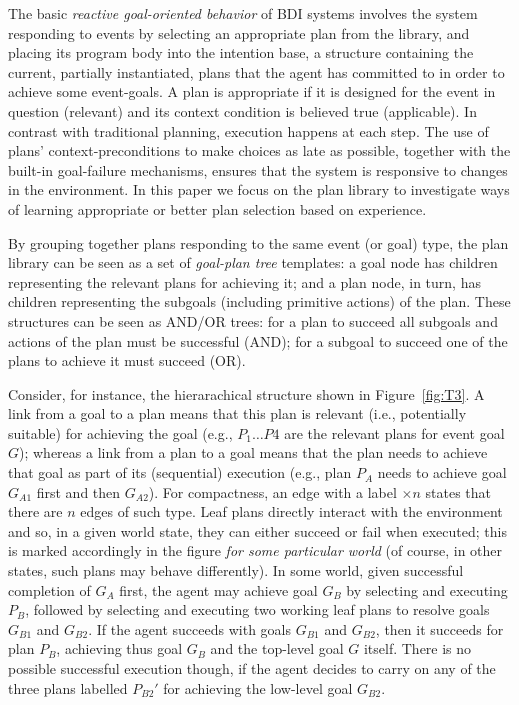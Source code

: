 The basic \emph{reactive goal-oriented behavior} of BDI systems involves the
system responding to events by selecting an appropriate plan from the library,
and placing its program body into the intention base, a structure containing the
current, partially instantiated, plans that the agent has committed to in order
to achieve some event-goals.
A plan is appropriate if it is designed for the event in question (relevant) and
its context condition is believed true (applicable).
In contrast with traditional planning, execution happens at each step. The use of
plans' context-preconditions to make choices as late as possible, together with
the built-in goal-failure mechanisms, ensures that the system is responsive to
changes in the environment.
In this paper we focus on the plan library to investigate ways of learning
appropriate or better plan selection based on experience.

By grouping together plans responding to the same
event (or goal) type, the plan library can be seen as a set of \emph{goal-plan tree}
templates: a goal node has children representing the
relevant plans for achieving it; and a plan node, in turn, has children
representing the subgoals (including primitive actions) of the plan.
These structures can be seen as AND/OR trees: for a plan to succeed all
subgoals and actions of the plan must be successful (AND); for a subgoal to
succeed one of the plans to achieve it must succeed (OR).


Consider, for instance, the hierarachical structure shown in Figure~\ref{fig:T3}.
A link from a goal to a plan means that this plan is relevant (i.e., potentially
suitable) for achieving the goal (e.g., $P_1 \ldots P4$ are the relevant plans
for event goal $G$); whereas a link from a plan to a goal means that the plan
needs to achieve that goal as part of its (sequential) execution (e.g., plan
$P_A$ needs to achieve goal $G_{A1}$ first and then $G_{A2}$).
For compactness, an edge with a label $\times n$ states that there are $n$ edges
of such type.
Leaf plans directly interact with the environment and so, in a given world state,
they can either succeed or fail when executed; this is marked accordingly in the
figure \emph{for some particular world} (of course, in other states, such plans
may behave differently).
In some world, given successful completion of $G_A$ first, the agent may achieve
goal $G_B$ by selecting and executing $P_B$, followed by selecting and executing two working leaf plans to resolve goals $G_{B1}$ and $G_{B2}$. If the agent
succeeds with goals $G_{B1}$ and $G_{B2}$, then it succeeds for plan $P_B$,
achieving thus goal $G_B$ and the top-level goal $G$ itself. There is no possible
successful execution though, if the agent decides to carry on any of the three
plans labelled $P_{B2}'$ for achieving the low-level goal $G_{B2}$.


